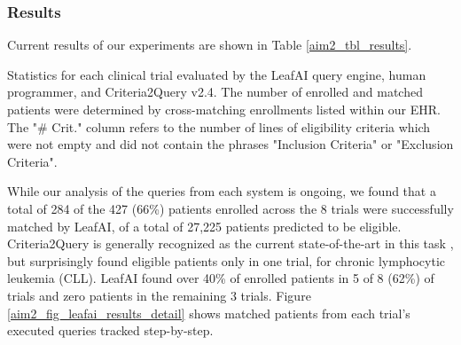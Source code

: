 \documentclass[../main.tex]{subfiles}
\begin{document}
\subsubsection{Results}

Current results of our experiments are shown in Table \ref{aim2_tbl_results}.

\begin{table}[h!]
    \footnotesize
    \centering
    
    \caption{Statistics for each clinical trial evaluated by the LeafAI query engine, human programmer, and Criteria2Query v2.4. The number of enrolled and matched patients were determined by cross-matching enrollments listed within our EHR. The "\# Crit." column refers to the number of lines of eligibility criteria which were not empty and did not contain the phrases "Inclusion Criteria" or "Exclusion Criteria".}
    \label{aim2_tbl_results}
\end{table} 

While our analysis of the queries from each system is ongoing, we found that a total of 284 of the 427 (66\%) patients enrolled across the 8 trials were successfully matched by LeafAI, of a total of 27,225 patients predicted to be eligible. Criteria2Query is generally recognized as the current state-of-the-art in this task \cite{tseo2020information, zhang2020deepenroll, gao2020compose}, but surprisingly found eligible patients only in one trial, for chronic lymphocytic leukemia (CLL). LeafAI found over 40\% of enrolled patients in 5 of 8 (62\%) of trials and zero patients in the remaining 3 trials. Figure \ref{aim2_fig_leafai_results_detail} shows matched patients from each trial's executed queries tracked step-by-step.
\end{document}
